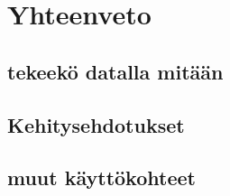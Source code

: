 \chapter{Yhteenveto}%
\label{ch:yhteenveto}

\section{tekeekö datalla mitään }

\section{Kehitysehdotukset}

\section{muut käyttökohteet}
